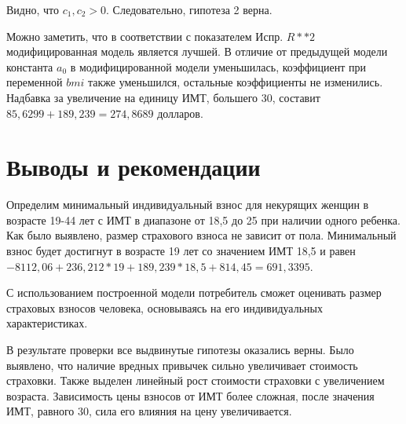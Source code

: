 \documentclass[a4paper,12pt]{article}
\begin{document}
Видно, что $c_1, c_2 >0$. Следовательно, гипотеза 2 верна.

Можно заметить, что в соответствии с показателем Испр. $R**2$ модифицированная модель является лучшей. В отличие от предыдущей модели константа $a_0$ в модифицированной модели уменьшилась, коэффициент при переменной $bmi$ также уменьшился, остальные коэффициенты не изменились. Надбавка за увеличение на единицу ИМТ, большего 30, составит $85,6299 + 189,239 = 274,8689$ долларов.






\section{Выводы и рекомендации}
Определим минимальный индивидуальный взнос для некурящих женщин в возрасте 19-44 лет с ИМТ в диапазоне от 18,5 до 25 при наличии одного ребенка. Как было выявлено, размер страхового взноса не зависит от пола. Минимальный взнос будет достигнут в возрасте 19 лет со значением ИМТ 18,5 и равен $-8112,06 + 236,212 * 19 + 189,239 * 18,5 + 814,45 = 691,3395$.

С использованием построенной модели потребитель сможет оценивать размер страховых взносов человека, основываясь на его индивидуальных характеристиках. 

В результате проверки все выдвинутые гипотезы оказались верны.
Было выявлено, что наличие вредных привычек сильно увеличивает стоимость страховки. Также выделен линейный рост стоимости страховки с увеличением возраста. Зависимость цены взносов от ИМТ более сложная, после значения ИМТ, равного 30, сила его влияния на цену увеличивается.
\end{document}
